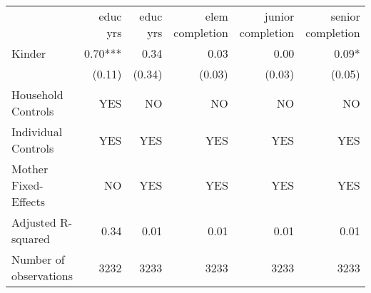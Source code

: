 \begin{tabular}{llllll}
\cline{1-6}
\multicolumn{1}{c}{} &
  \multicolumn{1}{r}{educ yrs} &
  \multicolumn{1}{r}{educ yrs} &
  \multicolumn{1}{r}{elem completion} &
  \multicolumn{1}{r}{junior completion} &
  \multicolumn{1}{r}{senior completion} \\
\cline{1-6}
\multicolumn{1}{l}{Kinder} &
  \multicolumn{1}{r}{0.70***} &
  \multicolumn{1}{r}{0.34 } &
  \multicolumn{1}{r}{0.03 } &
  \multicolumn{1}{r}{0.00 } &
  \multicolumn{1}{r}{0.09* } \\
\multicolumn{1}{l}{} &
  \multicolumn{1}{r}{(0.11)} &
  \multicolumn{1}{r}{(0.34)} &
  \multicolumn{1}{r}{(0.03)} &
  \multicolumn{1}{r}{(0.03)} &
  \multicolumn{1}{r}{(0.05)} \\
\multicolumn{1}{l}{Household Controls} &
  \multicolumn{1}{r}{YES} &
  \multicolumn{1}{r}{NO} &
  \multicolumn{1}{r}{NO} &
  \multicolumn{1}{r}{NO} &
  \multicolumn{1}{r}{NO} \\
\multicolumn{1}{l}{Individual Controls} &
  \multicolumn{1}{r}{YES} &
  \multicolumn{1}{r}{YES} &
  \multicolumn{1}{r}{YES} &
  \multicolumn{1}{r}{YES} &
  \multicolumn{1}{r}{YES} \\
\multicolumn{1}{l}{Mother Fixed-Effects} &
  \multicolumn{1}{r}{NO} &
  \multicolumn{1}{r}{YES} &
  \multicolumn{1}{r}{YES} &
  \multicolumn{1}{r}{YES} &
  \multicolumn{1}{r}{YES} \\
\multicolumn{1}{l}{Adjusted R-squared} &
  \multicolumn{1}{r}{0.34} &
  \multicolumn{1}{r}{0.01} &
  \multicolumn{1}{r}{0.01} &
  \multicolumn{1}{r}{0.01} &
  \multicolumn{1}{r}{0.01} \\
\multicolumn{1}{l}{Number of observations} &
  \multicolumn{1}{r}{3232} &
  \multicolumn{1}{r}{3233} &
  \multicolumn{1}{r}{3233} &
  \multicolumn{1}{r}{3233} &
  \multicolumn{1}{r}{3233} \\
\cline{1-6}
\end{tabular}
